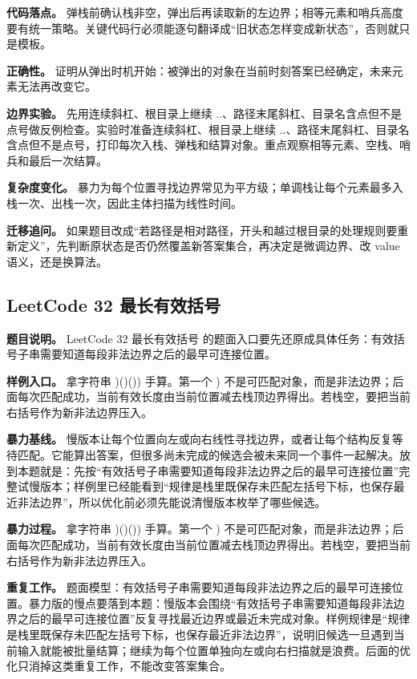 \textbf{代码落点。} 弹栈前确认栈非空，弹出后再读取新的左边界；相等元素和哨兵高度要有统一策略。关键代码行必须能逐句翻译成“旧状态怎样变成新状态”，否则就只是模板。

\textbf{正确性。} 证明从弹出时机开始：被弹出的对象在当前时刻答案已经确定，未来元素无法再改变它。

\textbf{边界实验。} 先用连续斜杠、根目录上继续 ..、路径末尾斜杠、目录名含点但不是点号做反例检查。实验时准备连续斜杠、根目录上继续 ..、路径末尾斜杠、目录名含点但不是点号，打印每次入栈、弹栈和结算对象。重点观察相等元素、空栈、哨兵和最后一次结算。

\textbf{复杂度变化。} 暴力为每个位置寻找边界常见为平方级；单调栈让每个元素最多入栈一次、出栈一次，因此主体扫描为线性时间。

\textbf{迁移追问。} 如果题目改成“若路径是相对路径，开头和越过根目录的处理规则要重新定义”，先判断原状态是否仍然覆盖新答案集合，再决定是微调边界、改 value 语义，还是换算法。

\subsection{LeetCode 32 最长有效括号}

\textbf{题目说明。} LeetCode 32 最长有效括号 的题面入口要先还原成具体任务：有效括号子串需要知道每段非法边界之后的最早可连接位置。

\textbf{样例入口。} 拿字符串 )()()) 手算。第一个 ) 不是可匹配对象，而是非法边界；后面每次匹配成功，当前有效长度由当前位置减去栈顶边界得出。若栈空，要把当前右括号作为新非法边界压入。

\textbf{暴力基线。} 慢版本让每个位置向左或向右线性寻找边界，或者让每个结构反复等待匹配。它能算出答案，但很多尚未完成的候选会被未来同一个事件一起解决。放到本题就是：先按“有效括号子串需要知道每段非法边界之后的最早可连接位置”完整试慢版本；样例里已经能看到“规律是栈里既保存未匹配左括号下标，也保存最近非法边界”，所以优化前必须先能说清慢版本枚举了哪些候选。

\textbf{暴力过程。} 拿字符串 )()()) 手算。第一个 ) 不是可匹配对象，而是非法边界；后面每次匹配成功，当前有效长度由当前位置减去栈顶边界得出。若栈空，要把当前右括号作为新非法边界压入。

\textbf{重复工作。} 题面模型：有效括号子串需要知道每段非法边界之后的最早可连接位置。暴力版的慢点要落到本题：慢版本会围绕“有效括号子串需要知道每段非法边界之后的最早可连接位置”反复寻找最近边界或最近未完成对象。样例规律是“规律是栈里既保存未匹配左括号下标，也保存最近非法边界”，说明旧候选一旦遇到当前输入就能被批量结算；继续为每个位置单独向左或向右扫描就是浪费。后面的优化只消掉这类重复工作，不能改变答案集合。

